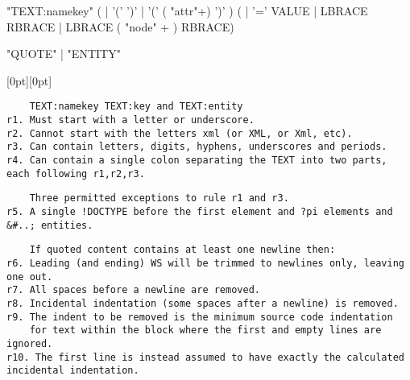 \documentclass[10pt,a4paper]{article}
\makeatletter
\newcommand*{\shifttext}[2]{%
  \settowidth{\@tempdima}{#2}%
  \raisebox{0pt}[0pt][0pt]{%
  \makebox[\@tempdima]{\hspace*{#1}#2}}%
}
\makeatother
\begin{document}
\vspace{5pt}
\begin{minipage}{15cm}
  \begin{rail}
    "TEXT:namekey" ( | '(' ')' | '(' ( "attr"+) ')' ) ( | '=' VALUE | LBRACE RBRACE | LBRACE ( "node" + ) RBRACE)
  \end{rail}
\end{minipage}

\vspace{-68pt}
\begin{minipage}{7cm}
  \begin{minipage}{6cm}
    \begin{rail}
      "QUOTE" | "ENTITY"
    \end{rail}
  \end{minipage}
\end{minipage}

\pagebreak

\shifttext{-20mm}{\raisebox{-8.8cm}{\smash{\rotatebox{90}{\rule{36mm}{0.5pt}\ \texttt{RULES}\ \rule{36mm}{.5pt}}}}}

\verb|    TEXT:namekey TEXT:key and TEXT:entity| \\
\verb|r1. Must start with a letter or underscore.| \\
\verb|r2. Cannot start with the letters xml (or XML, or Xml, etc).| \\
\verb|r3. Can contain letters, digits, hyphens, underscores and periods.| \\
\verb|r4. Can contain a single colon separating the TEXT into two parts, each following r1,r2,r3.|

\vspace{-1mm}
\verb|    Three permitted exceptions to rule r1 and r3.| \\
\verb|r5. A single !DOCTYPE before the first element and ?pi elements and &#..; entities.|

\vspace{-1mm}
\verb|    If quoted content contains at least one newline then:|\\
\verb|r6. Leading (and ending) WS will be trimmed to newlines only, leaving one out.| \\
\verb|r7. All spaces before a newline are removed.| \\
\verb|r8. Incidental indentation (some spaces after a newline) is removed.|\\
\verb|r9. The indent to be removed is the minimum source code indentation|\\
\verb|    for text within the block where the first and empty lines are ignored.|\\
\verb|r10. The first line is instead assumed to have exactly the calculated incidental indentation.|\\
\end{document}
